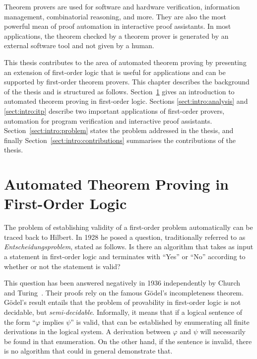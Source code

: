 Theorem provers are used for software and hardware verification, information management, combinatorial reasoning, and more. They are also the most powerful mean of proof automation in interactive proof assistants. In most applications, the theorem checked by a theorem prover is generated by an external software tool and not given by a human. %

This thesis contributes to the area of automated theorem proving by presenting an extension of first-order logic that is useful for applications and can be supported by first-order theorem provers. This chapter describes the background of the thesis and is structured as follows. Section~\ref{sect:intro:fol} gives an introduction to automated theorem proving in first-order logic. Sections \ref{sect:intro:analysis} and \ref{sect:intro:itp} describe two important applications of first-order provers, automation for program verification and interactive proof assistants. Section~\ref{sect:intro:problem} states the problem addressed in the thesis, and finally Section~\ref{sect:intro:contributions} summarises the contributions of the thesis.


\section[Automated Theorem Proving in First-Order Logic]{Automated Theorem Proving in\\First-Order Logic}\label{sect:intro:fol}
The problem of establishing validity of a first-order problem automatically can be traced back to Hilbert. In 1928 he posed a question, traditionally referred to as \emph{Entscheidungsproblem}\iffalse(German for ``decision problem'')\fi, stated as follows. Is there an algorithm that takes as input a statement in first-order logic and terminates with ``Yes'' or ``No'' according to whether or not the statement is valid?

This question has been answered negatively in 1936 independently by Church~\cite{church1936unsolvable} and Turing~\cite{turing1936computable}. Their proofs rely on the famous G\"{o}del's incompleteness theorem\iffalse~\cite{godel1931formal} (for an English translation see e.g. \cite[pp. 4--38]{davis1965undecidable})\fi. G\"{o}del's result entails that the problem of provability in first-order logic is not decidable, but \emph{semi-decidable}. Informally, it means that if a logical sentence of the form ``$\varphi$ implies $\psi$'' is valid, that can be established by enumerating all finite derivations in the logical system. A derivation between $\varphi$ and $\psi$ will necessarily be found in that enumeration. On the other hand, if the sentence is invalid, there is no algorithm that could in general demonstrate that.


